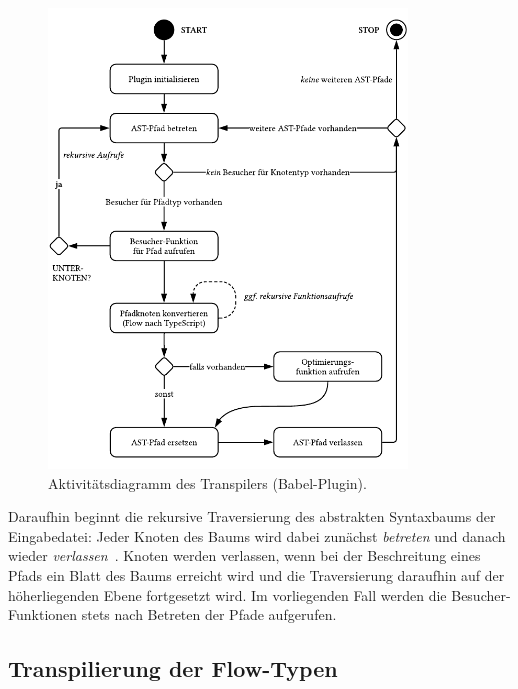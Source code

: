 
\begin{figure}[tbp]
  \centering
  \includegraphics[width=0.85\textwidth]{src/4_Umsetzung/fig/activity-diagram-plugin.pdf}
  \caption{Aktivitätsdiagramm des Transpilers (Babel-Plugin).}
  \label{fig:activity-diagram-plugin}
\end{figure}

Daraufhin beginnt die rekursive Traversierung des abstrakten Syntaxbaums der Eingabedatei: Jeder Knoten des Baums wird dabei zunächst \textit{betreten} und danach wieder \textit{verlassen}~\autocite{BABEL_HANDBOOK}. Knoten werden verlassen, wenn bei der Beschreitung eines Pfads ein Blatt des Baums erreicht wird und die Traversierung daraufhin auf der höherliegenden Ebene fortgesetzt wird. Im vorliegenden Fall werden die Besucher-Funktionen stets nach Betreten der Pfade aufgerufen.


\subsection{Transpilierung der Flow-Typen}

